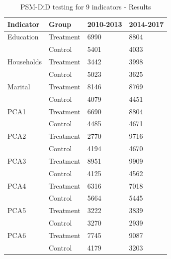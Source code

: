\documentclass{mcmthesis}
\begin{document}
\begin{table}[htbp]
\centering
\begin{tabular}{p{90pt}<{\raggedright}lp{90pt}<{\raggedleft}p{90pt}<{\raggedleft}}
\toprule[1.5pt]
Indicator & Group & 2010-2013 & 2014-2017\\
\midrule[1pt]
 {\textcolor[rgb]{ 1,  0,  0}{Education}} & Treatment & 6990 & 8804 \\
 & Control & 5401 & 4033 \\
 {\textcolor[rgb]{ 1,  0,  0}{Households}} & Treatment & 3442 & 3998 \\
   & Control & 5023 & 3625 \\
   Marital & Treatment & 8146 & 8769 \\
     & Control & 4079 & 4451 \\
     PCA1 & Treatment & 6690 & 8804 \\
       & Control & 4485 & 4671 \\
       {\textcolor[rgb]{ 1,  0,  0}{PCA2}} & Treatment & 2770 & 9716 \\
        & Control & 4194 & 4670 \\
         PCA3 & Treatment & 8951 & 9909 \\
           & Control & 4125 & 4562 \\
           PCA4 & Treatment & 6316 & 7018 \\
            & Control & 5664 & 5445 \\
           PCA5 & Treatment & 3222 & 3839 \\
            & Control & 3270 & 2939 \\
           {\textcolor[rgb]{ 1,  0,  0}{PCA6}} & Treatment & 7745 & 9087 \\
            & Control & 4179 & 3203 \\
\bottomrule[1.5pt]

\end{tabular}
\caption{PSM-DiD testing for 9 indicators - Results} 
\end{table}
\end{document}
